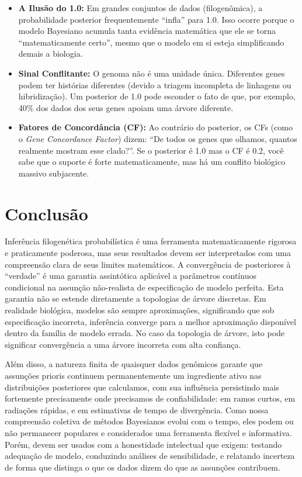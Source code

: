 \begin{tcolorbox}[
    colback=green!5!white, 
    colframe=green!50!black, 
    title=\textbf{Posterior 1.0 vs. Realidade Biológica},
    arc=2mm
]
\begin{itemize}
    \item \textbf{A Ilusão do 1.0:} Em grandes conjuntos de dados (filogenômica), a probabilidade posterior frequentemente ``infla'' para 1.0. Isso ocorre porque o modelo Bayesiano acumula tanta evidência matemática que ele se torna ``matematicamente certo'', mesmo que o modelo em si esteja simplificando demais a biologia.
    \item \textbf{Sinal Conflitante:} O genoma não é uma unidade única. Diferentes genes podem ter histórias diferentes (devido a triagem incompleta de linhagens ou hibridização). Um posterior de 1.0 pode esconder o fato de que, por exemplo, 40\% dos dados dos seus genes apoiam uma árvore diferente.
    \item \textbf{Fatores de Concordância (CF):} Ao contrário do posterior, os CFs (como o \textit{Gene Concordance Factor}) dizem: ``De todos os genes que olhamos, quantos realmente mostram esse clado?''. Se o posterior é 1.0 mas o CF é 0.2, você sabe que o suporte é forte matematicamente, mas há um conflito biológico massivo subjacente.
\end{itemize}
\end{tcolorbox}

\section{Conclusão}

Inferência filogenética probabilística é uma ferramenta matematicamente rigorosa e praticamente poderosa, mas seus resultados devem ser interpretados com uma compreensão clara de seus limites matemáticos. A convergência de posteriores à ``verdade'' é uma garantia assintótica aplicável a parâmetros contínuos condicional na assunção não-realista de especificação de modelo perfeita. Esta garantia não se estende diretamente a topologias de árvore discretas. Em realidade biológica, modelos são sempre aproximações, significando que sob especificação incorreta, inferência converge para a melhor aproximação disponível dentro da família de modelo errada. No caso da topologia de árvore, isto pode significar convergência a uma árvore incorreta com alta confiança.

Além disso, a natureza finita de quaisquer dados genômicos garante que assunções prioris continuem permanentemente um ingrediente ativo nas distribuições posteriores que calculamos, com sua influência persistindo mais fortemente precisamente onde precisamos de confiabilidade: em ramos curtos, em radiações rápidas, e em estimativas de tempo de divergência. Como nossa compreensão coletiva de métodos Bayesianos evolui com o tempo, eles podem ou não permanecer populares e considerados uma ferramenta flexível e informativa. Porém, devem ser usados com a honestidade intelectual que exigem: testando adequação de modelo, conduzindo análises de sensibilidade, e relatando incerteza de forma que distinga o que os dados dizem do que as assunções contribuem.

